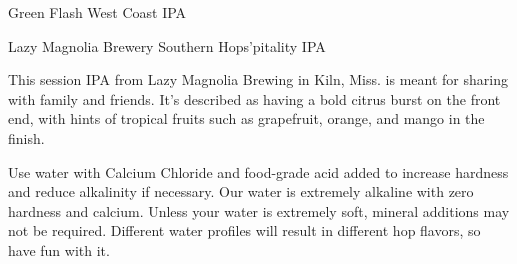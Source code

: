 \begin{recipie}{Green Flash West Coast IPA}
\begin{ingredientsblock}
\begin{yeasts}
\end{yeasts}

\end{ingredientsblock}

\end{recipie}

\begin{recipie}{Lazy Magnolia Brewery Southern Hops'pitality IPA}

\begin{aboutblock}
This session IPA from Lazy Magnolia Brewing in Kiln, Miss. is meant for sharing with
family and friends. It's described as having a bold citrus burst on the front end, with
hints of tropical fruits such as grapefruit, orange, and mango in the finish.
\end{aboutblock}


\begin{methodandtiming}
 
\begin{mashsteps}
\end{mashsteps}

\begin{fermentationsteps}
\end{fermentationsteps}

\begin{directions}
Use water with Calcium Chloride and food-grade acid added to increase hardness and reduce alkalinity
if necessary. Our water is extremely alkaline with zero hardness and calcium. Unless your water is
extremely soft, mineral additions may not be required. Different water profiles will result in
different hop flavors, so have fun with it.
\end{directions}

\end{methodandtiming}

\pagebreak

\begin{ingredientsblock}

\begin{malts}
\end{malts}

\begin{hops}
\end{hops}


\end{ingredientsblock}
\end{recipie}
